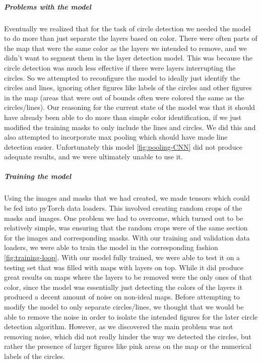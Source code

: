 \documentclass[a4paper,12pt]{extarticle}
\begin{document}
\subparagraph{Problems with the model\\}
Eventually we realized that for the task of circle detection we needed the model to do more than just separate the layers based on color.
There were often parts of the map that were the same color as the layers we intended to remove, and we didn't want to segment them in the layer detection model.
This was because the circle detection was much less effective if there were layers interrupting the circles. So we attempted to reconfigure the model to ideally just identify the circles and lines, ignoring other figures like labels of the circles and other figures in the map (areas that were out of bounds often were colored the same as the circles/lines).
Our reasoning for the current state of the model was that it should have already been able to do more than simple color identification, if we just modified the training masks to only include the lines and circles. We did this and also attempted to incorporate max pooling which should have made line detection easier. Unfortunately this model \ref{fig:pooling-CNN} did not produce adequate results, and we were ultimately unable to use it.


\subparagraph{Training the model\\}
Using the images and masks that we had created, we made tensors which could be fed into pyTorch data loaders.
This involved creating random crops of the masks and images. One problem we had to overcome, which turned out to be relatively simple, was ensuring that the random crops were of the same section for the images and corresponding masks. With our training and validation data loaders, we were able to train the model in the corresponding fashion \ref{fig:training-loop}. With our model fully trained, we were able to test it on a testing set that was filled with maps with layers on top. While it did produce great results on maps where the layers to be removed were the only ones of that color, since the model was essentially just detecting the colors of the layers it produced a decent amount of noise on non-ideal maps. Before attempting to modify the model to only separate circles/lines, we thought that we would be able to remove the noise in order to isolate the intended figures for the later circle detection algorithm. However, as we discovered the main problem was not removing noise, which did not really hinder the way we detected the circles, but rather the presence of larger figures like pink areas on the map or the numerical labels of the circles. 
\end{document}
